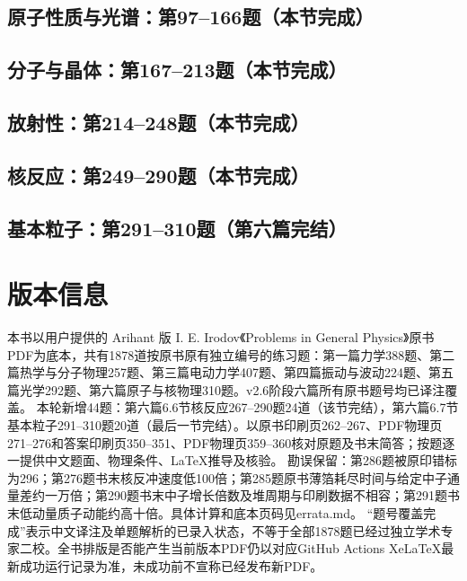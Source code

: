 \documentclass[lang=cn,color=blue,11pt]{elegantbook}
\begin{document}
\section{原子性质与光谱：第97--166题（本节完成）}






\section{分子与晶体：第167--213题（本节完成）}



\section{放射性：第214--248题（本节完成）}



\section{核反应：第249--290题（本节完成）}




\section{基本粒子：第291--310题（第六篇完结）}


\backmatter
\chapter*{版本信息}
本书以用户提供的 Arihant 版 I. E. Irodov《Problems in General Physics》原书PDF为底本，共有1878道按原书原有独立编号的练习题：第一篇力学388题、第二篇热学与分子物理257题、第三篇电动力学407题、第四篇振动与波动224题、第五篇光学292题、第六篇原子与核物理310题。v2.6阶段六篇所有原书题号均已译注覆盖。
本轮新增44题：第六篇6.6节核反应267--290题24道（该节完结），第六篇6.7节基本粒子291--310题20道（最后一节完结）。以原书印刷页262--267、PDF物理页271--276和答案印刷页350--351、PDF物理页359--360核对原题及书末简答；按题逐一提供中文题面、物理条件、LaTeX推导及核验。
勘误保留：第286题被原印错标为296；第276题书末核反冲速度低100倍；第285题原书薄箔耗尽时间与给定中子通量差约一万倍；第290题书末中子增长倍数及堆周期与印刷数据不相容；第291题书末低动量质子动能约高十倍。具体计算和底本页码见errata.md。
“题号覆盖完成”表示中文译注及单题解析的已录入状态，不等于全部1878题已经过独立学术专家二校。全书排版是否能产生当前版本PDF仍以对应GitHub Actions XeLaTeX最新成功运行记录为准，未成功前不宣称已经发布新PDF。
\end{document}
